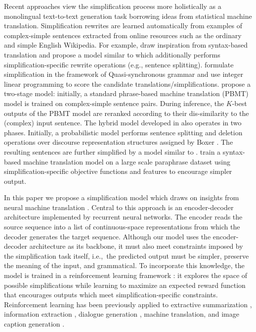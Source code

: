 \documentclass[11pt,letterpaper]{article}
\begin{document}
Recent approaches view the simplification process more holistically as
a monolingual text-to-text generation task borrowing ideas from
statistical machine translation. Simplification rewrites are learned
automatically from examples of complex-simple sentences extracted from
online resources such as the ordinary and simple English
Wikipedia. For example,  draw inspiration
from syntax-based translation and propose a model similar to
 which additionally performs
simplification-specific rewrite operations (e.g., sentence
splitting).  formulate
simplification in the framework of Quasi-synchronous grammar
\cite{smith2006quasi} and use integer linear programming to score the
candidate translations/simplifications. 
propose a two-stage model: initially, a standard phrase-based machine
translation (PBMT) model is trained on complex-simple sentence
pairs. During inference, the $K$-best outputs of the PBMT model are
reranked according to their dis-similarity to the (complex) input
sentence. The hybrid model developed in 
also operates in two phases.  Initially, a probabilistic model
performs sentence splitting and deletion operations over discourse
representation structures assigned by Boxer
\cite{curran-clark-bos:2007:PosterDemo}.  The resulting sentences are
further simplified by a model similar to .
 train a syntax-based machine translation model on
a large scale paraphrase dataset \cite{ganitkevitch2013ppdb} using
simplification-specific objective functions and features to encourage
simpler output.



In this paper we propose a simplification model which draws on
insights from neural machine translation
\cite{bahdanau2014neural,sutskever2014sequence}.  Central to this
approach is an encoder-decoder architecture implemented by recurrent
neural networks.  The encoder reads the source sequence into a list of
continuous-space representations from which the decoder generates the
target sequence. Although our model uses the encoder-decoder
architecture as its backbone, it must also meet constraints imposed by
the simplification task itself, i.e.,~the predicted output must be
simpler, preserve the meaning of the input, and grammatical. To
incorporate this knowledge, the model is trained in a reinforcement
learning framework \cite{williams1992simple}: it explores the space of
possible simplifications while learning to maximize an expected reward
function that encourages outputs which meet simplification-specific
constraints. Reinforcement learning has been previously applied to
extractive summarization \cite{ryang-abekawa:2012:EMNLP}, information
extraction \cite{narasimhan:2016:EMNLP2016}, dialogue generation
\cite{li-EtAl:2016:EMNLP}, machine translation, and image caption
generation \cite{ranzato2016sequence}.
\end{document}
